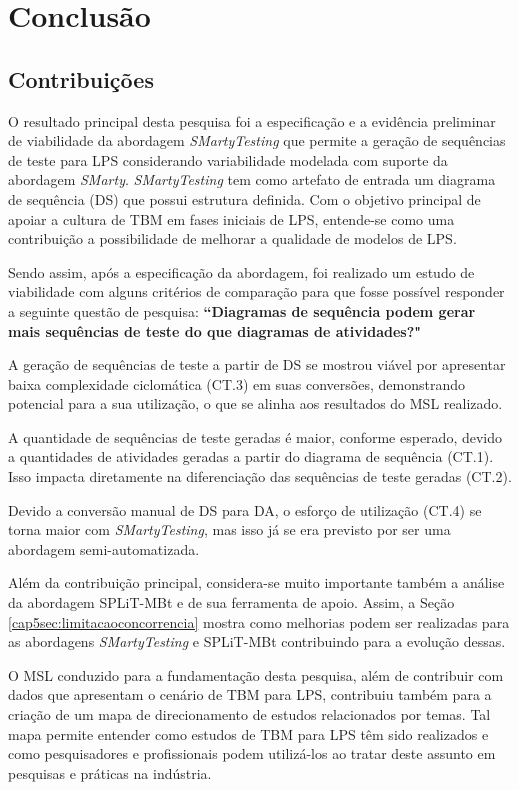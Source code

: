 \chapter{Conclusão}
\label{cap6:conclusao}
\pagestyle{plain}

\section{Contribuições}
\label{cap6sec:contribuicoes}

O resultado principal desta pesquisa foi a especificação e a evidência preliminar de viabilidade da abordagem \textit{SMartyTesting} que permite a geração de sequências de teste para LPS considerando variabilidade modelada com suporte da abordagem \textit{SMarty}. \textit{SMartyTesting} tem como artefato de entrada um diagrama de sequência (DS) que possui estrutura definida. Com o objetivo principal de apoiar a cultura de TBM em fases iniciais de LPS, entende-se como uma contribuição a possibilidade de melhorar a qualidade de modelos de LPS.


Sendo assim, após a especificação da abordagem, foi realizado um estudo de viabilidade com alguns critérios de comparação para que fosse possível responder a seguinte questão de pesquisa: \textbf{``Diagramas de sequência podem gerar mais sequências de teste do que diagramas de atividades?"}


A geração de sequências de teste a partir de DS se mostrou viável por apresentar baixa complexidade ciclomática (CT.3) em suas conversões, demonstrando potencial para a sua utilização, o que se alinha aos resultados do MSL realizado.


A quantidade de sequências de teste geradas é maior, conforme esperado, devido a quantidades de atividades geradas a partir do diagrama de sequência (CT.1). Isso impacta diretamente na diferenciação das sequências de teste geradas (CT.2).


Devido a conversão manual de DS para DA, o esforço de utilização (CT.4) se torna maior com \textit{SMartyTesting}, mas isso já se era previsto por ser uma abordagem semi-automatizada.

Além da contribuição principal, considera-se muito importante também a análise da abordagem SPLiT-MBt e de sua ferramenta de apoio. Assim, a Seção \ref{cap5sec:limitacaoconcorrencia} mostra como melhorias podem ser realizadas para as abordagens \textit{SMartyTesting} e SPLiT-MBt contribuindo para a evolução dessas.

O MSL conduzido para a fundamentação desta pesquisa, além de contribuir com dados que apresentam o cenário de TBM para LPS, contribuiu também para a criação de um mapa de direcionamento de estudos relacionados por temas. Tal mapa permite entender como estudos de TBM para LPS têm sido realizados e como pesquisadores e profissionais podem utilizá-los ao tratar deste assunto em pesquisas e práticas na indústria.

